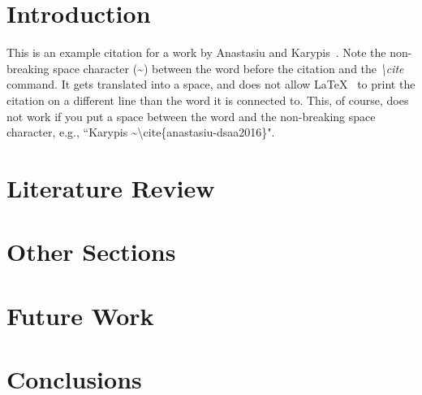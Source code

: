 \section{Introduction}\label{sec:introduction}
This is an example citation for a work by Anastasiu and Karypis~\cite{anastasiu-dsaa2016}. Note the non-breaking space character (\textasciitilde) between the word before the citation and the \textit{{\textbackslash}cite} command. It gets translated into a space, and does not allow \LaTeX~ to print the citation on a different line than the word it is connected to. This, of course, does not work if you put a space between the word and the non-breaking space character, e.g., ``Karypis \textasciitilde{\textbackslash}cite\{anastasiu-dsaa2016\}".

\section{Literature Review}\label{sec:literature_review}



\section{Other Sections}\label{sec:appropriate_label}






\section{Future Work}\label{sec:future_work}




\section{Conclusions}\label{sec:conclusions}




